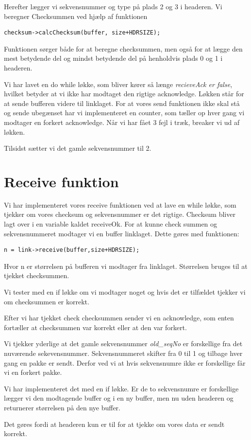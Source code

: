 Herefter lægger vi sekvensnummer og type på plads 2 og 3 i headeren. 
Vi beregner Checksummen ved hjælp af funktionen 
\begin{lstlisting}
checksum->calcChecksum(buffer, size+HDRSIZE);
\end{lstlisting}
Funktionen sørger både for at beregne checksummen, men også for at lægge den mest betydende del og mindst betydende del på henholdvis plads 0 og 1 i headeren.

Vi har lavet en do while løkke, som bliver kører så længe \textit{recieveAck er false}, hvilket betyder at vi ikke har modtaget den rigtige acknowledge. Løkken står for at sende bufferen videre til linklaget. 
For at vores send funktionen ikke skal stå og sende ubegænset har vi implementeret en counter, som tæller op hver gang vi modtager en forkert acknowledge. Når vi har fået 3 fejl i træk, breaker vi ud af løkken. 

Tilsidst sætter vi det gamle sekvensnummer til 2.

\section{Receive funktion}

Vi har implementeret vores receive funktionen ved at lave en while løkke, som tjekker om vores checksum og sekvensnummer er det rigtige. 
Checksum bliver lagt over i en variable kaldet receiveOk. 
For at kunne check summen og sekvensnummeret modtager vi en buffer linklaget. 
Dette gøres med funktionen: 
\begin{lstlisting}
n = link->receive(buffer,size+HDRSIZE);
\end{lstlisting}
Hvor n er størrelsen på bufferen vi modtager fra linklaget. Størrelsen bruges til at tjekket checksummen. 

Vi tester med en if løkke om vi modtager noget og hvis det er tilfældet tjekker vi om checksummen er korrekt. 

Efter vi har tjekket check checksummen sender vi en acknowledge, som enten fortæller at checksummen var korrekt eller at den var forkert. 

Vi tjekker yderlige at det gamle sekvensnummer \textit{old\_seqNo} er forskellige fra det nuværende sekevensnummer. Sekvensnummeret skifter fra 0 til 1 og tilbage hver gang en pakke er sendt. Derfor ved vi at hvis sekvensnumre ikke er forskellige får vi en forkert pakke.  

Vi har implementeret det med en if løkke. 
Er de to sekvensnumre er forskellige lægger vi den modtagende buffer og i en ny buffer, men nu uden headeren og returnerer størrelsen på den nye buffer.

Det gøres fordi at headeren kun er til for at tjekke om vores data er sendt korrekt.  
